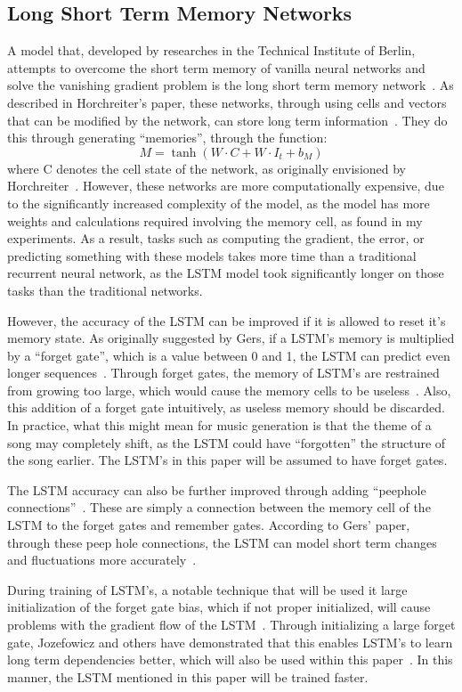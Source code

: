 \documentclass[12pt]{article}
\begin{document}
\subsection{Long Short Term Memory Networks}
A model that, developed by researches in the Technical Institute of Berlin,
attempts to overcome the short term memory of vanilla neural networks and solve
the vanishing gradient problem is the long short term memory
network~\cite{lstm}. As described in Horchreiter's paper, these networks,
through using cells and vectors that can be modified by the network, can store
long term information~\cite{lstm}. They do this through generating ``memories'',
through the function:
$$M = \tanh(W\cdot C + W\cdot I_t + b_M)$$
where C denotes the cell state of the network, as originally envisioned by
Horchreiter~\cite{lstm}. However, these networks are more computationally
expensive, due to the significantly increased complexity of the model, as the
model has more weights and calculations required involving the memory cell, as
found in my experiments. As a result, tasks such as computing the gradient, the
error, or predicting something with these models takes more time than a
traditional recurrent neural network, as the LSTM model took significantly
longer on those tasks than the traditional networks.

However, the accuracy of the LSTM can be improved if it is allowed to reset it's
memory state. As originally suggested by Gers, if a LSTM's memory is multiplied
by a ``forget gate'', which is a value between 0 and 1, the LSTM can predict
even longer sequences~\cite{forgetgate}. Through forget gates, the memory of
LSTM's are restrained from growing too large, which would cause the memory cells
to be useless~\cite{forgetgate}. Also, this addition of a forget gate
intuitively, as useless memory should be discarded. In practice, what this might
mean for music generation is that the theme of a song may completely shift, as
the LSTM could have ``forgotten'' the structure of the song earlier. The LSTM's
in this paper will be assumed to have forget gates.

The LSTM accuracy can also be further improved through adding ``peephole
connections''~\cite{lstmpeep}. These are simply a connection between the memory
cell of the LSTM to the forget gates and remember gates. According to Gers'
paper, through these peep hole connections, the LSTM can model short term
changes and fluctuations more accurately~\cite{lstmpeep}.

During training of LSTM's, a notable technique that will be used it large
initialization of the forget gate bias, which if not proper initialized, will
cause problems with the gradient flow of the LSTM~\cite{lstmbias}. Through
initializing a large forget gate, Jozefowicz and others have demonstrated that
this enables LSTM's to learn long term dependencies better, which will also be
used within this paper~\cite{lstmbias}. In this manner, the LSTM mentioned in
this paper will be trained faster.
\end{document}
